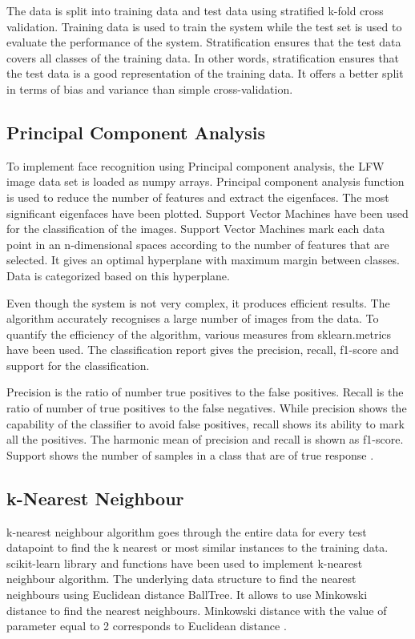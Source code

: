 \documentclass[conference]{IEEEtran}
\begin{document}
The data is split into training data and test data using stratified k-fold cross validation. Training data is used to train the system while the test set is used to evaluate the performance of the system. Stratification ensures that the test data covers all classes of the training data. In other words, stratification ensures that the test data is a good representation of the training data. It offers a better split in terms of bias and variance than simple cross-validation. 


\subsection{Principal Component Analysis} 
\label{subsec: 4b. Principal Component Analysis}
To implement face recognition using Principal component analysis, the LFW image data set is loaded as numpy arrays. Principal component analysis function is used to reduce the number of features and extract the eigenfaces. The most significant eigenfaces have been plotted. Support Vector Machines have been used for the classification of the images. Support Vector Machines mark each data point in an n-dimensional spaces according to the number of features that are selected. It gives an optimal hyperplane with maximum margin between classes. Data is categorized based on this hyperplane.


Even though the system is not very complex, it produces efficient results. The algorithm accurately recognises a large number of images from the data. To quantify the efficiency of the algorithm, various measures from sklearn.metrics have been used. The classification report gives the precision, recall, f1-score and support for the classification. 

Precision is the ratio of number true positives to the false positives. Recall is the ratio of number of true positives to the false negatives. While precision shows the capability of the classifier to avoid false positives, recall shows its ability to mark all the positives. The harmonic mean of precision and recall is shown as f1-score. Support shows the number of samples in a class that are of true response \cite{scikit-learn}.

\subsection{k-Nearest Neighbour} 
\label{subsec: 4c k-Nearest Neighbour}
k-nearest neighbour algorithm goes through the entire data for every test datapoint to find the k nearest or most similar instances to the training data. scikit-learn library and functions have been used to implement k-nearest neighbour algorithm. The underlying data structure to find the nearest neighbours using Euclidean distance BallTree. It allows to use Minkowski distance to find the nearest neighbours. Minkowski distance with the value of parameter equal to 2 corresponds to Euclidean distance \cite{weinberger2006distance}.
\end{document}
